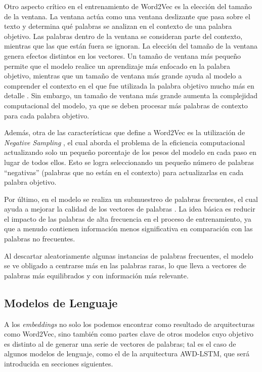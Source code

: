 Otro aspecto crítico en el entrenamiento de Word2Vec es la elección del tamaño de la ventana. La ventana actúa como una ventana deslizante que pasa sobre el texto y determina qué palabras se analizan en el contexto de una palabra objetivo. Las palabras dentro de la ventana se consideran parte del contexto, mientras que las que están fuera se ignoran. La elección del tamaño de la ventana genera efectos distintos en los vectores. Un tamaño de ventana más pequeño permite que el modelo realice un aprendizaje más enfocado en la palabra objetivo, mientras que un tamaño de ventana más grande ayuda al modelo a comprender el contexto en el que fue utilizada la palabra objetivo mucho más en detalle \parencite{levy2014}. Sin embargo, un tamaño de ventana más grande aumenta la complejidad computacional del modelo, ya que se deben procesar más palabras de contexto para cada palabra objetivo.

Además, otra de las características que define a Word2Vec es la utilización de \textit{Negative Sampling} \parencite{mikolov2013distributedrepresentationswordsphrases}, el cual aborda el problema de la eficiencia computacional actualizando solo un pequeño porcentaje de los pesos del modelo en cada paso en lugar de todos ellos. Esto se logra seleccionando un pequeño número de palabras “negativas” (palabras que no están en el contexto) para actualizarlas en cada palabra objetivo.

Por último, en el modelo se realiza un submuestreo de palabras frecuentes, el cual ayuda a mejorar la calidad de los vectores de palabras \parencite{mikolov2013distributedrepresentationswordsphrases}. La idea básica es reducir el impacto de las palabras de alta frecuencia en el proceso de entrenamiento, ya que a menudo contienen información menos significativa en comparación con las palabras no frecuentes.

Al descartar aleatoriamente algunas instancias de palabras frecuentes, el modelo se ve obligado a centrarse más en las palabras raras, lo que lleva a vectores de palabras más equilibrados y con información más relevante.

\subsection{Modelos de Lenguaje}

A los \textit{embeddings} no solo los podemos encontrar como resultado de arquitecturas como Word2Vec, sino también como partes clave de otros modelos cuyo objetivo es distinto al de generar una serie de vectores de palabras; tal es el caso de algunos modelos de lenguaje, como el de la arquitectura AWD-LSTM, que será introducida en secciones siguientes.

